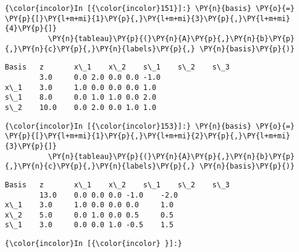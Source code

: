     \begin{Verbatim}[commandchars=\\\{\}]
{\color{incolor}In [{\color{incolor}151}]:} \PY{n}{basis} \PY{o}{=} \PY{p}{[}\PY{l+m+mi}{1}\PY{p}{,}\PY{l+m+mi}{3}\PY{p}{,}\PY{l+m+mi}{4}\PY{p}{]}
          \PY{n}{tableau}\PY{p}{(}\PY{n}{A}\PY{p}{,}\PY{n}{b}\PY{p}{,}\PY{n}{c}\PY{p}{,}\PY{n}{labels}\PY{p}{,} \PY{n}{basis}\PY{p}{)}
\end{Verbatim}

    \begin{Verbatim}[commandchars=\\\{\}]
Basis	z   	x\_1	x\_2	s\_1	s\_2	s\_3 
     	3.0 	0.0	2.0	0.0	0.0	-1.0
x\_1  	3.0 	1.0	0.0	0.0	0.0	1.0 
s\_1  	8.0 	0.0	1.0	1.0	0.0	2.0 
s\_2  	10.0	0.0	2.0	0.0	1.0	1.0 

    \end{Verbatim}

    \begin{Verbatim}[commandchars=\\\{\}]
{\color{incolor}In [{\color{incolor}153}]:} \PY{n}{basis} \PY{o}{=} \PY{p}{[}\PY{l+m+mi}{1}\PY{p}{,}\PY{l+m+mi}{2}\PY{p}{,}\PY{l+m+mi}{3}\PY{p}{]}
          \PY{n}{tableau}\PY{p}{(}\PY{n}{A}\PY{p}{,}\PY{n}{b}\PY{p}{,}\PY{n}{c}\PY{p}{,}\PY{n}{labels}\PY{p}{,} \PY{n}{basis}\PY{p}{)}
\end{Verbatim}

    \begin{Verbatim}[commandchars=\\\{\}]
Basis	z   	x\_1	x\_2	s\_1	s\_2 	s\_3 
     	13.0	0.0	0.0	0.0	-1.0	-2.0
x\_1  	3.0 	1.0	0.0	0.0	0.0 	1.0 
x\_2  	5.0 	0.0	1.0	0.0	0.5 	0.5 
s\_1  	3.0 	0.0	0.0	1.0	-0.5	1.5 

    \end{Verbatim}

    \begin{Verbatim}[commandchars=\\\{\}]
{\color{incolor}In [{\color{incolor} }]:} 
\end{Verbatim}



  
